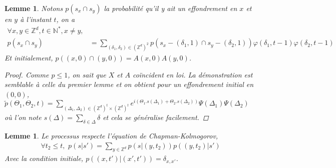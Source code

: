 \documentclass{article}
\newtheorem{lemma}[theorem]{Lemme}
\theoremstyle{definition}
\begin{document}
\begin{lemma}
	Notons $p(s_x\cap s_y)$ la probabilité qu'il y ait un effondrement en $x$ et en $y$ à l'instant $t$, on a
\begin{align*}
	\forall x, y\in \mathbb{Z}^d, t\in\mathbb{N}^*, x\neq y, \\p(s_x \cap s_y) &= \sum_{(\delta_1,\delta_2)\in (\mathbb{Z}^d)^2} p(s_x-(\delta_1, 1) \cap s_y-(\delta_2,1))\varphi(\delta_1,t-1)\varphi(\delta_2,t-1)\label{1}\tag{1}
\end{align*} 
Et initialement, $p((x,0)\cap (y,0)) = A(x,0)A(y,0)$. \begin{proof}
	Comme $p\leq 1$, on sait que $X$ et $A$ coïncident en loi. 
	La démonstration est semblable à celle du premier lemme et on obtient pour un effondrement initial en $(0,0)$, $\tilde{p}(\Theta_1, \Theta_2, t)=\sum_{(\Delta_1,\Delta_2)\in (\mathbb{Z}^d)^t\times(\mathbb{Z}^d)^t} e^{i(\Theta_1.s(\Delta_1)+\Theta_2.s(\Delta_2))} \Psi(\Delta_1)\Psi(\Delta_2)$ où l'on note $s(\Delta) = \sum_{\delta\in \Delta}\delta$ et cela se généralise facilement.
\end{proof}
\end{lemma}

\begin{lemma}
	Le processus respecte l'équation de Chapman-Kolmogorov, 
\begin{align*}
\forall t_2\leq t, \,\,p(s|s') = \sum_{y\in\mathbb{Z}^d}p(s|(y,t_2))p((y,t_2)|s')\end{align*}
Avec la condition initiale, $p((x,t')|(x',t')) = \delta_{x, x'}$.
\end{lemma}
\end{document}
